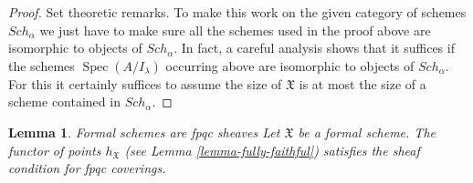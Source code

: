 \documentclass{stacks-project}
\newenvironment{slogan}{\comment}{\endcomment}
\theoremstyle{plain}
\newtheorem{lemma}[subsection]{Lemma}
\theoremstyle{definition}
\theoremstyle{remark}
\numberwithin{equation}{subsection}
\def\Spec{\mathop{\mathrm{Spec}}}
\def\Sch{\mathit{Sch}}
\begin{document}
\begin{proof}
\medskip\noindent
Set theoretic remarks. To make this work on the given category
of schemes $\Sch_\alpha$ we just have to make sure all the
schemes used in the proof above are isomorphic to objects of $\Sch_\alpha$.
In fact, a careful analysis shows that it suffices if the
schemes $\Spec(A/I_\lambda)$ occurring above are isomorphic to
objects of $\Sch_\alpha$. For this it certainly suffices to assume
the size of $\mathfrak X$ is at most the size of
a scheme contained in $\Sch_\alpha$.
\end{proof}

\begin{lemma}
\label{lemma-formal-scheme-sheaf-fppf}
\begin{slogan}
Formal schemes are fpqc sheaves
\end{slogan}
Let $\mathfrak X$ be a formal scheme. The functor of points
$h_\mathfrak X$ (see Lemma \ref{lemma-fully-faithful})
satisfies the sheaf condition for fpqc coverings.
\end{lemma}
\end{document}

